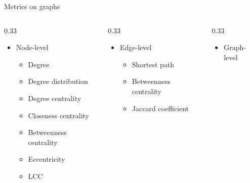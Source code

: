     \begin{frame}{Metrics on graphs}
        \begin{columns}[t] %
            \begin{column}{0.33\textwidth}
                \begin{itemize}
                    \item \alert{Node-level}
                    \begin{itemize}
                        \item Degree
                        \item Degree distribution
                        \item Degree centrality
                        \item Closeness centrality
                        \item Betweenness centrality
                        \item Eccentricity
                        \item LCC
                    \end{itemize}
                \end{itemize}
            \end{column}
            \begin{column}{0.33\textwidth}
                \begin{itemize}
                    \item \alert{Edge-level}
                    \begin{itemize}
                        \item Shortest path
                        \item Betweenness centrality
                        \item Jaccard coefficient
                    \end{itemize}
                \end{itemize}
            \end{column}
            \begin{column}{0.33\textwidth}
                \begin{itemize}
                    \item \alert{Graph-level}
                    \begin{itemize}

\end{itemize}
\end{itemize}
\end{column}
\end{columns}
\end{frame}
